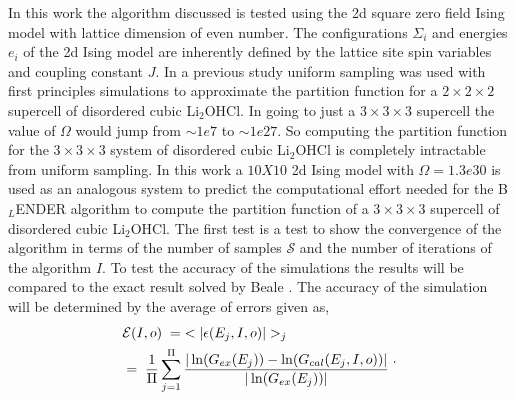\documentclass[aps,prl,reprint,superscriptaddress,showkeys]{revtex4-1}
\begin{document}
In this work the algorithm discussed is tested using the 2d square zero field  Ising model with lattice dimension of even number\cite{exact_statistical,Onsager,Ising}.  The configurations $\Sigma_i$ and energies $e_i$ of the 2d Ising model are inherently defined by the lattice site spin variables and coupling constant $J$. In a previous study\cite{partition} uniform sampling was used with first principles simulations to approximate the partition function for a $2\times 2\times 2$ supercell  of disordered cubic Li$_2$OHCl. In going to just a $3\times 3\times 3$ supercell the value of $\Omega$ would jump from $\sim 1e7$ to  $\sim 1e27$. So computing the partition function for the $3\times 3\times 3$ system of disordered cubic Li$_2$OHCl is completely intractable from uniform sampling. In this work a $10X10$ 2d Ising model with $\Omega = 1.3e30$ is used as an analogous system to predict the computational effort needed for the B$_L$ENDER algorithm to compute the partition function of a  $3\times 3\times 3$ supercell of disordered cubic Li$_2$OHCl.  The first test is a test to show the convergence of the algorithm in terms of the number of samples $\mathcal{S}$ and the number of iterations of the algorithm $I$. To test the accuracy of the simulations the results will be compared to the exact result solved by Beale \cite{Beale_2d_ising}. The accuracy of the simulation will be determined by the average of errors given as, 
\begin{equation}
\begin{split}
 &\mathcal{E}(I,o) \hspace{0.1cm}= \hspace{0.1cm}< |\epsilon(E_j,I,o)| >_j\\
& = \hspace{0.1cm}  \frac{1}{\Pi} \sum_{j=1}^{\Pi}\frac{|\ln(G_{ex}(E_j))- \ln(G_{cal}(E_j,I,o))|}{|\ln(G_{ex}(E_j))|}\; 
 \end{split}. 
\end{equation}
\end{document}
